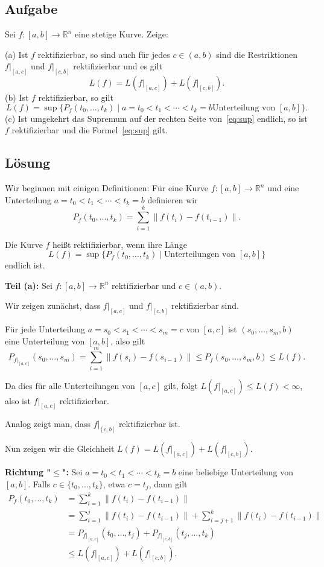 \documentclass{article}
\newcommand{\R}{\mathbb{R}}
\begin{document}
\subsection*{Aufgabe}
Sei $f:[a,b]\to\R^n$ eine stetige Kurve. Zeige:

(a) Ist $f$ rektifizierbar, so sind auch für jedes $c\in(a,b)$ sind
die Restriktionen $f|_{[a,c]}$ und $f|_{[c,b]}$ rektifizierbar und es gilt
$$
   L(f) = L(f|_{[a,c]}) + L(f|_{[c,b]}).
$$
(b) Ist $f$ rektifizierbar, so gilt
\begin{equation}\label{eq:sup}
   L(f) = \sup\{P_f(t_0,\dots,t_k)\mid a=t_0<t_1<\cdots<t_k=b \text{
     Unterteilung von }[a,b]\}.
\end{equation}
(c) Ist umgekehrt das Supremum auf der rechten Seite
von~\eqref{eq:sup} endlich, so ist $f$ rektifizierbar und die
Formel~\eqref{eq:sup} gilt.

\subsection*{Lösung}

Wir beginnen mit einigen Definitionen: Für eine Kurve $f:[a,b]\to\R^n$ und eine Unterteilung $a=t_0<t_1<\cdots<t_k=b$ definieren wir
$$P_f(t_0,\dots,t_k) = \sum_{i=1}^k \|f(t_i) - f(t_{i-1})\|.$$

Die Kurve $f$ heißt rektifizierbar, wenn ihre Länge
$$L(f) = \sup\{P_f(t_0,\dots,t_k) \mid \text{Unterteilungen von } [a,b]\}$$
endlich ist.

\textbf{Teil (a):} Sei $f:[a,b]\to\R^n$ rektifizierbar und $c\in(a,b)$.

Wir zeigen zunächst, dass $f|_{[a,c]}$ und $f|_{[c,b]}$ rektifizierbar sind.

Für jede Unterteilung $a=s_0<s_1<\cdots<s_m=c$ von $[a,c]$ ist $(s_0,\dots,s_m,b)$ eine Unterteilung von $[a,b]$, also gilt
$$P_{f|_{[a,c]}}(s_0,\dots,s_m) = \sum_{i=1}^m \|f(s_i)-f(s_{i-1})\| \leq P_f(s_0,\dots,s_m,b) \leq L(f).$$

Da dies für alle Unterteilungen von $[a,c]$ gilt, folgt $L(f|_{[a,c]}) \leq L(f) < \infty$, also ist $f|_{[a,c]}$ rektifizierbar.

Analog zeigt man, dass $f|_{[c,b]}$ rektifizierbar ist.

Nun zeigen wir die Gleichheit $L(f) = L(f|_{[a,c]}) + L(f|_{[c,b]})$.

\textbf{Richtung "$\leq$":} Sei $a=t_0<t_1<\cdots<t_k=b$ eine beliebige Unterteilung von $[a,b]$. Falls $c \in \{t_0,\dots,t_k\}$, etwa $c = t_j$, dann gilt
\begin{align}
P_f(t_0,\dots,t_k) &= \sum_{i=1}^k \|f(t_i)-f(t_{i-1})\|\\
&= \sum_{i=1}^j \|f(t_i)-f(t_{i-1})\| + \sum_{i=j+1}^k \|f(t_i)-f(t_{i-1})\|\\
&= P_{f|_{[a,c]}}(t_0,\dots,t_j) + P_{f|_{[c,b]}}(t_j,\dots,t_k)\\
&\leq L(f|_{[a,c]}) + L(f|_{[c,b]}).
\end{align}
\end{document}
